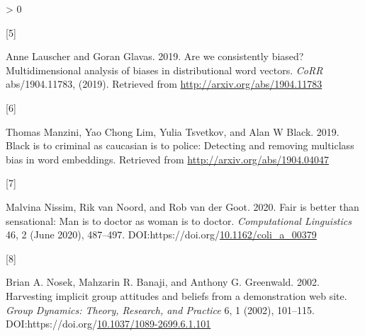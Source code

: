 \documentclass[
  10pt,
  dvipsnames,enabledeprecatedfontcommands, twocolumn]{scrartcl}
\newlength{\cslhangindent}
\newlength{\csllabelwidth}
\newenvironment{CSLReferences}[2] %
 {%
  \setlength{\parindent}{0pt}
  \ifodd #1 \everypar{\setlength{\hangindent}{\cslhangindent}}\ignorespaces\fi
  \ifnum #2 > 0
  \setlength{\parskip}{#2\baselineskip}
  \fi
 }%
 {}
\newcommand{\CSLLeftMargin}[1]{\parbox[t]{\csllabelwidth}{#1}}
\newcommand{\CSLRightInline}[1]{\parbox[t]{\linewidth - \csllabelwidth}{#1}\break}
\begin{document}
\begin{CSLReferences}{0}{0}
\leavevmode\hypertarget{ref-Lauscher2019multidimensional}{}%
\CSLLeftMargin{{[}5{]} }
\CSLRightInline{Anne Lauscher and Goran Glavas. 2019. Are we
consistently biased? Multidimensional analysis of biases in
distributional word vectors. \emph{CoRR} abs/1904.11783, (2019).
Retrieved from \url{http://arxiv.org/abs/1904.11783}}

\leavevmode\hypertarget{ref-Manzini2019blackToCriminal}{}%
\CSLLeftMargin{{[}6{]} }
\CSLRightInline{Thomas Manzini, Yao Chong Lim, Yulia Tsvetkov, and Alan
W Black. 2019. Black is to criminal as caucasian is to police: Detecting
and removing multiclass bias in word embeddings. Retrieved from
\url{http://arxiv.org/abs/1904.04047}}

\leavevmode\hypertarget{ref-Nissim2020fair}{}%
\CSLLeftMargin{{[}7{]} }
\CSLRightInline{Malvina Nissim, Rik van Noord, and Rob van der Goot.
2020. Fair is better than sensational: Man is to doctor as woman is to
doctor. \emph{Computational Linguistics} 46, 2 (June 2020), 487--497.
DOI:https://doi.org/\href{https://doi.org/10.1162/coli_a_00379}{10.1162/coli\_a\_00379}}

\leavevmode\hypertarget{ref-Nosek2002harvesting}{}%
\CSLLeftMargin{{[}8{]} }
\CSLRightInline{Brian A. Nosek, Mahzarin R. Banaji, and Anthony G.
Greenwald. 2002. Harvesting implicit group attitudes and beliefs from a
demonstration web site. \emph{Group Dynamics: Theory, Research, and
Practice} 6, 1 (2002), 101--115.
DOI:https://doi.org/\href{https://doi.org/10.1037/1089-2699.6.1.101}{10.1037/1089-2699.6.1.101}}

\end{CSLReferences}
\end{document}
